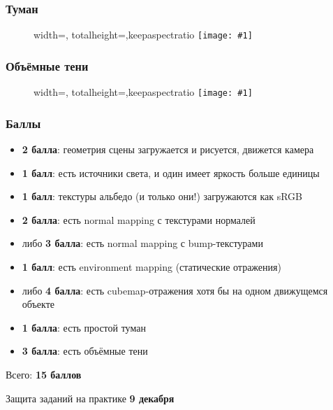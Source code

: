 \documentclass[10pt]{beamer}
\newcommand{\slideimage}[1]{
  \begin{figure}
    \begin{adjustbox}{width=\textwidth, totalheight=\textheight-2\baselineskip-2\baselineskip,keepaspectratio}
      \texttt{[image: \#1]}
    \end{adjustbox}
  \end{figure}
}
\begin{document}
\begin{frame}[fragile]
\frametitle{Туман}
\slideimage{fog.png}
\end{frame}

\begin{frame}[fragile]
\frametitle{Объёмные тени}
\slideimage{volumetric.png}
\end{frame}

\begin{frame}[fragile]
\frametitle{Баллы}
\begin{itemize}
\item \textbf{2 балла}: геометрия сцены загружается и рисуется, движется камера
\item \textbf{1 балл}: есть источники света, и один имеет яркость больше единицы
\item \textbf{1 балл}: текстуры альбедо (и только они!) загружаются как sRGB
\item \textbf{2 балла}: есть normal mapping с текстурами нормалей
\item либо \textbf{3 балла}: есть normal mapping с bump-текстурами
\item \textbf{1 балл}: есть environment mapping (статические отражения)
\item либо \textbf{4 балла}: есть cubemap-отражения хотя бы на одном движущемся объекте
\item \textbf{1 балла}: есть простой туман
\item \textbf{3 балла}: есть объёмные тени
\end{itemize}
Всего: \textbf{15 баллов}

Защита заданий на практике \textbf{9 декабря}
\end{frame}
\end{document}
